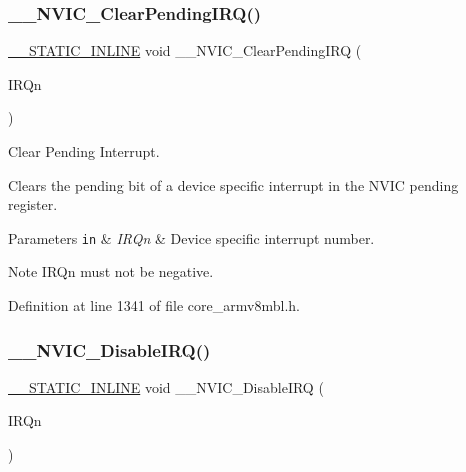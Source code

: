 \subsubsection{\texorpdfstring{\+\_\+\+\_\+\+N\+V\+I\+C\+\_\+\+Clear\+Pending\+I\+R\+Q()}{\_\_NVIC\_ClearPendingIRQ()}}
{\footnotesize\ttfamily \hyperlink{cmsis__iccarm_8h_aba87361bfad2ae52cfe2f40c1a1dbf9c}{\+\_\+\+\_\+\+S\+T\+A\+T\+I\+C\+\_\+\+I\+N\+L\+I\+NE} void \+\_\+\+\_\+\+N\+V\+I\+C\+\_\+\+Clear\+Pending\+I\+RQ (\begin{DoxyParamCaption}\item[{\hyperlink{group___c_m_s_i_s__18_x_x___i_r_q_gaa44deabd252bda567898bae35a086adc}{I\+R\+Qn\+\_\+\+Type}}]{I\+R\+Qn }\end{DoxyParamCaption})}



Clear Pending Interrupt. 

Clears the pending bit of a device specific interrupt in the N\+V\+IC pending register. 
\begin{DoxyParams}[1]{Parameters}
\mbox{\tt in}  & {\em I\+R\+Qn} & Device specific interrupt number. \\
\hline
\end{DoxyParams}
\begin{DoxyNote}{Note}
I\+R\+Qn must not be negative. 
\end{DoxyNote}


Definition at line 1341 of file core\+\_\+armv8mbl.\+h.

\mbox{\label{group___c_m_s_i_s___core___n_v_i_c_functions_gae016e4c1986312044ee768806537d52f}} 
\subsubsection{\texorpdfstring{\+\_\+\+\_\+\+N\+V\+I\+C\+\_\+\+Disable\+I\+R\+Q()}{\_\_NVIC\_DisableIRQ()}}
{\footnotesize\ttfamily \hyperlink{cmsis__iccarm_8h_aba87361bfad2ae52cfe2f40c1a1dbf9c}{\+\_\+\+\_\+\+S\+T\+A\+T\+I\+C\+\_\+\+I\+N\+L\+I\+NE} void \+\_\+\+\_\+\+N\+V\+I\+C\+\_\+\+Disable\+I\+RQ (\begin{DoxyParamCaption}\item[{\hyperlink{group___c_m_s_i_s__18_x_x___i_r_q_gaa44deabd252bda567898bae35a086adc}{I\+R\+Qn\+\_\+\+Type}}]{I\+R\+Qn }\end{DoxyParamCaption})}



